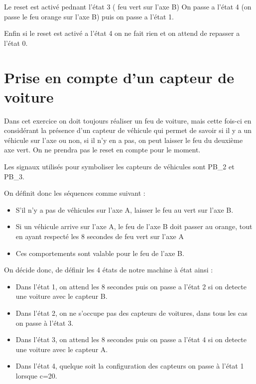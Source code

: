 \documentclass[11pt]{report}
\begin{document}
Le reset est activé pednant l'état 3 ( feu vert sur l'axe B)
On passe a l'état 4 (on passe le feu orange sur l'axe B) puis on passe a l'état 1.

Enfin si le reset est activé a l'état 4 on ne fait rien et on attend de repasser a l'état 0.

\newpage

\section{Prise en compte d'un capteur de voiture}


Dans cet exercice on doit toujours réaliser un feu de voiture, mais cette fois-ci en considérant la présence d'un capteur de véhicule qui permet de savoir si il y a un véhicule sur l'axe ou non, si il n'y en a pas, on peut laisser le feu du deuxième axe vert. On ne prendra pas le reset en compte pour le moment.

Les signaux utilisés pour symboliser les capteurs de véhicules sont PB\_2 et PB\_3.

On définit donc les séquences comme suivant :
\begin{itemize}
	\item S'il n'y a pas de véhicules sur l'axe A, laisser le feu au vert sur l'axe B.
	\item Si un véhicule arrive sur l'axe A, le feu de l'axe B doit passer au orange, tout en ayant respecté les 8 secondes de feu vert sur l'axe A
	\item Ces comportements sont valable pour le feu de l'axe B.

\end{itemize}

On décide donc, de définir les 4 états de notre machine à état ainsi :
\begin{itemize}
\item Dans l'état 1, on attend les 8 secondes puis on passe a l'état 2 si on detecte une voiture avec le capteur B.
\item Dans l'état 2, on ne s'occupe pas des capteurs de voitures, dans tous les cas on passe à l'état 3.
\item Dans l'état 3, on attend les 8 secondes puis on passe a l'état 4 si on detecte une voiture avec le capteur A.
\item Dans l'état 4, quelque soit la configuration des capteurs on passe à l'état 1 lorsque c=20.


\end{itemize}
\end{document}
